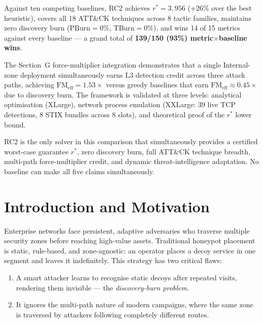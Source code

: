 \documentclass[12pt,a4paper]{article}
\newcommand{\rstar}{r^*}
\newcommand{\FMeff}{\mathrm{FM}_{\mathrm{eff}}}
\begin{document}
Against ten competing baselines, RC2 achieves $\rstar{=}3{,}956$ (+26\% over the best
heuristic), covers all 18 ATT\&CK techniques across 8 tactic families, maintains zero
discovery burn ($\mathrm{PBurn}{=}0\%$, $\mathrm{TBurn}{=}0\%$), and wins 14 of 15 metrics
against every baseline — a grand total of \textbf{139/150 (93\%) metric$\times$baseline wins}.

The Section~G force-multiplier integration demonstrates that a single Internal-zone
deployment simultaneously earns L3 detection credit across three attack paths, achieving
$\FMeff{=}1.53\times$ versus greedy baselines that earn $\FMeff{\approx}0.45\times$ due to
discovery burn. The framework is validated at three levels: analytical optimisation
(XLarge), network process emulation (XXLarge: 39 live TCP detections, 8 STIX bundles across
8 slots), and theoretical proof of the $\rstar$ lower bound.

\begin{keyresult}
RC2 is the only solver in this comparison that simultaneously provides a certified
worst-case guarantee $\rstar$, zero discovery burn, full ATT\&CK technique breadth,
multi-path force-multiplier credit, and dynamic threat-intelligence adaptation. No
baseline can make all five claims simultaneously.
\end{keyresult}

\clearpage
\tableofcontents
\clearpage

\section{Introduction and Motivation}

Enterprise networks face persistent, adaptive adversaries who traverse multiple security
zones before reaching high-value assets. Traditional honeypot placement is static,
rule-based, and zone-agnostic: an operator places a decoy service in one segment and
leaves it indefinitely. This strategy has two critical flaws:

\begin{enumerate}[leftmargin=*, label=(\arabic*)]
  \item A smart attacker learns to recognise static decoys after repeated visits,
        rendering them invisible — the \emph{discovery-burn problem}.
  \item It ignores the multi-path nature of modern campaigns, where the same zone is
        traversed by attackers following completely different routes.
\end{enumerate}
\end{document}
